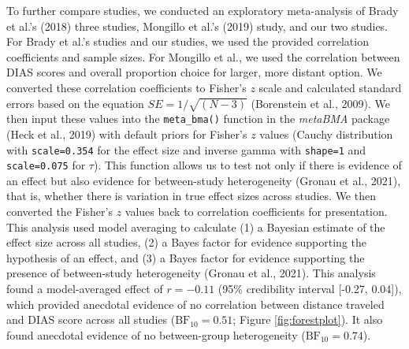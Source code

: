 \documentclass[
  pub,floatsintext]{apa6}
\begin{document}
To further compare studies, we conducted an exploratory meta-analysis of Brady et al.'s (2018) three studies, Mongillo et al.'s (2019) study, and our two studies. For Brady et al.'s studies and our studies, we used the provided correlation coefficients and sample sizes. For Mongillo et al., we used the correlation between DIAS scores and overall proportion choice for larger, more distant option. We converted these correlation coefficients to Fisher's \(z\) scale and calculated standard errors based on the equation \(SE = 1 / \sqrt{(N - 3)}\) (Borenstein et al., 2009). We then input these values into the \texttt{meta\_bma()} function in the \emph{metaBMA} package (Heck et al., 2019) with default priors for Fisher's \(z\) values (Cauchy distribution with \texttt{scale=0.354} for the effect size and inverse gamma with \texttt{shape=1} and \texttt{scale=0.075} for \(\tau\)). This function allows us to test not only if there is evidence of an effect but also evidence for between-study heterogeneity (Gronau et al., 2021), that is, whether there is variation in true effect sizes across studies. We then converted the Fisher's \(z\) values back to correlation coefficients for presentation. This analysis used model averaging to calculate (1) a Bayesian estimate of the effect size across all studies, (2) a Bayes factor for evidence supporting the hypothesis of an effect, and (3) a Bayes factor for evidence supporting the presence of between-study heterogeneity (Gronau et al., 2021). This analysis found a model-averaged effect of \(r = -0.11\) (95\% credibility interval {[}-0.27, 0.04{]}), which provided anecdotal evidence of no correlation between distance traveled and DIAS score across all studies (\(\mathrm{BF}_{\textrm{10}} = 0.51\); Figure \ref{fig:forestplot}). It also found anecdotal evidence of no between-group heterogeneity (\(\mathrm{BF}_{\textrm{10}} = 0.74\)).
\end{document}
